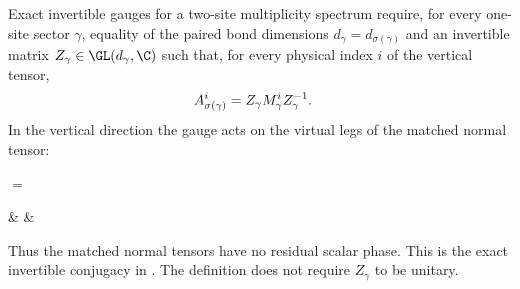 \begin{definition}%
    \label{def:mpdo_bnt_two_site_exact_sector_gauge}
    \leanok
    Exact invertible gauges for a two-site multiplicity spectrum require,
    for every one-site sector $\gamma$, equality
    of the paired bond dimensions $d_\gamma=d_{\sigma(\gamma)}$ and an
    invertible matrix $Z_\gamma\in\GL(d_\gamma,\C)$ such that, for every
    physical index $i$ of the vertical tensor,
    \begin{align}
        A_{\sigma(\gamma)}^i
         & =Z_\gamma M_\gamma^i Z_\gamma^{-1}.
        \notag
    \end{align}
    In the vertical direction the gauge acts on the virtual legs of the
    matched normal tensor:
    \begin{center}
        \tenkzkernel
        \begin{tenkz}[rows={wire}, cols=1, west=open, east=open]
        \end{tenkz}
        $ = $
        \begin{tenkz}[rows={wire}, cols=3, west=open, east=open]
             &
             &
        \end{tenkz}
    \end{center}
    Thus the matched normal tensors have no residual scalar phase. This is the
    exact invertible conjugacy in
    \cite[Appendix~C.4, lines~2053--2057]{Cirac2016MPDO_arXiv}.
    The definition does not require $Z_\gamma$ to be unitary.
\end{definition}

